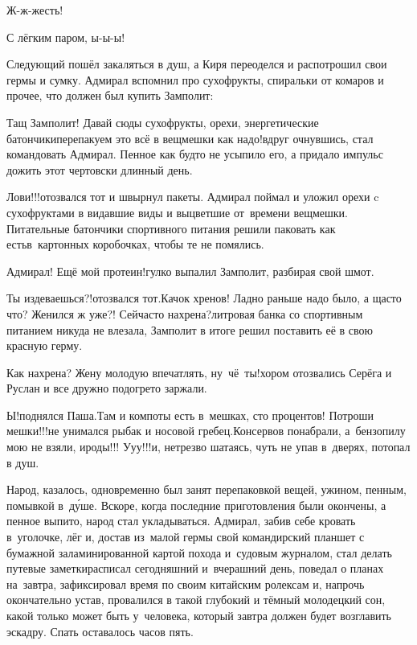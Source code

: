 \diagdash Ж-ж-жесть! 

\diagdash С лёгким паром, ы-ы-ы!

Следующий пошёл закаляться в душ, а Киря переоделся и распотрошил свои гермы и сумку. Адмирал вспомнил про сухофрукты, спиральки от комаров и прочее, что должен был купить Замполит:

\diagdash Тащ Замполит! Давай сюды сухофрукты, орехи, энергетические батончики\mdash перепакуем это всё в вещмешки как надо!\mdash вдруг очнувшись, стал командовать Адмирал. Пенное как будто не усыпило его, а придало импульс дожить этот чертовски длинный день. 

\diagdash Лови!!!\mdash отозвался тот и швырнул пакеты. Адмирал поймал и уложил орехи c сухофруктами в видавшие виды и выцветшие от~времени вещмешки. Питательные батончики спортивного питания решили паковать как есть\mdash в~картонных коробочках, чтобы те не помялись.

\diagdash Адмирал! Ещё мой протеин!\mdash гулко выпалил Замполит, разбирая свой шмот.

\diagdash Ты издеваешься?!\mdash отозвался тот.\mdash Качок хренов! Ладно раньше надо было, а щас\sdash то что? Женился ж уже?! Сейчас\sdash то нахрена?\sdash литровая банка со спортивным питанием никуда не влезала, Замполит в итоге решил поставить её в свою красную герму.

\diagdash Как нахрена? Жену молодую впечатлять, ну~чё~ты!\mdash хором отозвались Серёга и Руслан и все дружно подогрето заржали.

\diagdash Ы!\mdash поднялся Паша.\mdash Там и компоты есть в~мешках, сто процентов! Потроши мешки!!!\mdash не унимался рыбак и носовой гребец.\mdash Консервов понабрали, а~бензопилу мою не взяли, ироды!!! У\sdash у\sdash у!!!\mdash и, нетрезво шатаясь, чуть не упав в~дверях, потопал в душ.

\newpage
Народ, казалось, одновременно был занят перепаковкой вещей, ужином, пенным, помывкой в~д\'{у}ше. Вскоре, когда последние приготовления были окончены, а пенное выпито, народ стал укладываться. Адмирал, забив себе кровать в~уголочке, лёг и, достав из~малой гермы свой командирский планшет с бумажной заламинированной картой похода и~судовым журналом, стал делать путевые заметки\mdash расписал сегодняшний и~вчерашний день, поведал о планах на~завтра, зафиксировал время по своим китайским ролексам и, напрочь окончательно устав, провалился в такой глубокий и тёмный молодецкий сон, какой только может быть у~человека, который завтра должен будет возглавить эскадру. Спать оставалось часов пять.

\begin{center}
\end{center}

 






